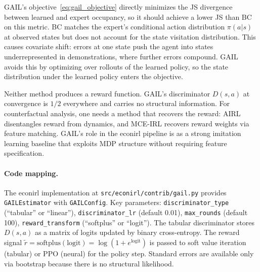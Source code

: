 \documentclass[11pt]{article}
\begin{document}
GAIL's objective~\eqref{eq:gail_objective} directly minimizes the JS divergence between learned and expert occupancy, so it should achieve a lower JS than BC on this metric.
BC matches the expert's conditional action distribution $\pi(a|s)$ at observed states but does not account for the state visitation distribution.
This causes covariate shift: errors at one state push the agent into states underrepresented in demonstrations, where further errors compound.
GAIL avoids this by optimizing over rollouts of the learned policy, so the state distribution under the learned policy enters the objective.

Neither method produces a reward function.
GAIL's discriminator $D(s,a)$ at convergence is $1/2$ everywhere and carries no structural information.
For counterfactual analysis, one needs a method that recovers the reward: AIRL \citep{fu2018} disentangles reward from dynamics, and MCE-IRL \citep{ziebart2010} recovers reward weights via feature matching.
GAIL's role in the econirl pipeline is as a strong imitation learning baseline that exploits MDP structure without requiring feature specification.

\paragraph{Code mapping.}
The econirl implementation at \texttt{src/econirl/contrib/gail.py} provides \texttt{GAILEstimator} with \texttt{GAILConfig}.
Key parameters: \texttt{discriminator\_type} (``tabular'' or ``linear''), \texttt{discriminator\_lr} (default 0.01), \texttt{max\_rounds} (default 100), \texttt{reward\_transform} (``softplus'' or ``logit'').
The tabular discriminator stores $D(s,a)$ as a matrix of logits updated by binary cross-entropy.
The reward signal $\tilde{r} = \text{softplus}(\text{logit}) = \log(1 + e^{\text{logit}})$ is passed to soft value iteration (tabular) or PPO (neural) for the policy step.
Standard errors are available only via bootstrap because there is no structural likelihood.


\end{document}
